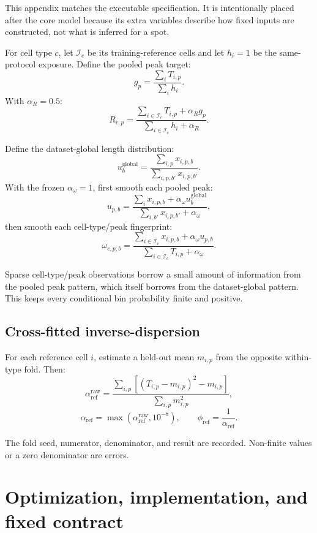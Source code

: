 \documentclass[11pt]{article}
\begin{document}
This appendix matches the executable specification. It is intentionally placed
after the core model because its extra variables describe how fixed inputs are
constructed, not what is inferred for a spot.

For cell type \(c\), let \(\mathcal I_c\) be its training-reference cells and
let \(h_i=1\) be the same-protocol exposure. Define the pooled peak target:
\[
g_p=\frac{\sum_iT_{i,p}}{\sum_ih_i}.
\]
With \(\alpha_R=0.5\):
\[
R_{c,p}
=
\frac{\sum_{i\in\mathcal I_c}T_{i,p}+\alpha_Rg_p}
{\sum_{i\in\mathcal I_c}h_i+\alpha_R}.
\]

Define the dataset-global length distribution:
\[
u_b^{\mathrm{global}}
=
\frac{\sum_{i,p}x_{i,p,b}}
{\sum_{i,p,b'}x_{i,p,b'}}.
\]
With the frozen \(\alpha_\omega=1\), first smooth each pooled peak:
\[
u_{p,b}
=
\frac{\sum_ix_{i,p,b}+\alpha_\omega u_b^{\mathrm{global}}}
{\sum_{i,b'}x_{i,p,b'}+\alpha_\omega},
\]
then smooth each cell-type/peak fingerprint:
\[
\omega_{c,p,b}
=
\frac{\sum_{i\in\mathcal I_c}x_{i,p,b}
+\alpha_\omega u_{p,b}}
{\sum_{i\in\mathcal I_c}T_{i,p}
+\alpha_\omega}.
\]

\begin{translation}
Sparse cell-type/peak observations borrow a small amount of information from the
pooled peak pattern, which itself borrows from the dataset-global pattern. This
keeps every conditional bin probability finite and positive.
\end{translation}

\subsection{Cross-fitted inverse-dispersion}

For each reference cell \(i\), estimate a held-out mean \(m_{i,p}\) from the
opposite within-type fold. Then:
\[
\alpha_{\mathrm{ref}}^{\mathrm{raw}}
=
\frac{\sum_{i,p}\left[(T_{i,p}-m_{i,p})^2-m_{i,p}\right]}
{\sum_{i,p}m_{i,p}^2},
\]
\[
\alpha_{\mathrm{ref}}
=
\max\!\left(\alpha_{\mathrm{ref}}^{\mathrm{raw}},10^{-8}\right),
\qquad
\phi_{\mathrm{ref}}=\frac{1}{\alpha_{\mathrm{ref}}}.
\]

The fold seed, numerator, denominator, and result are recorded. Non-finite values
or a zero denominator are errors.

\section{Optimization, implementation, and fixed contract}
\label{sec:optimization}
\end{document}
